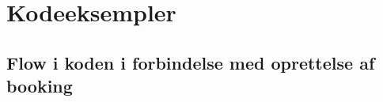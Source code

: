 \chapter{Kodeeksempler}
\label{App_Code}

\clearpage
\section{Flow i koden i forbindelse med oprettelse af booking}

\clearpage

\clearpage

\clearpage

